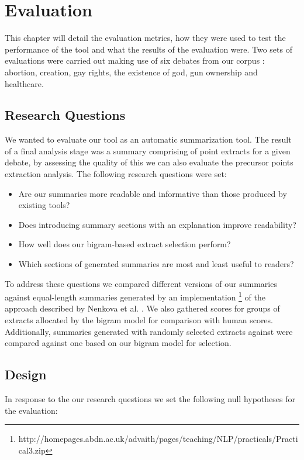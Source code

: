 \chapter{Evaluation\label{chap:evaluation}}
  This chapter will detail the evaluation metrics, how they were used to test the performance of the tool and what the results of the evaluation were. Two sets of evaluations were carried out making use of six debates from our corpus \cite{walker2012corpus}: abortion, creation, gay rights, the existence of god, gun ownership and healthcare.

  \section{Research Questions}
    We wanted to evaluate our tool as an automatic summarization tool. The result of a final analysis stage was a summary comprising of point extracts for a given debate, by assessing the quality of this we can also evaluate the precursor points extraction analysis. The following research questions were set:

    \begin{itemize}
      \item{Are our summaries more readable and informative than those produced by existing tools?}
      \item{Does introducing summary sections with an explanation improve readability?}
      \item{How well does our bigram-based extract selection perform?}
      \item{Which sections of generated summaries are most and least useful to readers?}
    \end{itemize}

    To address these questions we compared different versions of our summaries against equal-length summaries generated by an implementation \footnote{http://homepages.abdn.ac.uk/advaith/pages/teaching/NLP/practicals/Practical3.zip} of the approach described by Nenkova et al. \cite{nenkova2006compositional}. We also gathered scores for groups of extracts allocated by the bigram model for comparison with human scores. Additionally, summaries generated with randomly selected extracts against were compared against one based on our bigram model for selection.

  \section{Design}
    In response to the our research questions we set the following null hypotheses for the evaluation:

